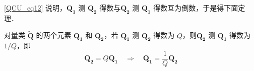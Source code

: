 \autoref{QCU_eq12} 说明，$\boldsymbol{Q_1}$ 测 $\boldsymbol{Q_2}$ 得数与$\boldsymbol{Q_2}$ 测 $\boldsymbol{Q_1}$ 得数互为倒数，于是得下面定理．
\begin{theorem}{}
对量类 $\widetilde{\boldsymbol{Q}}$ 的两个元素 $\boldsymbol{Q_1}$ 和 $\boldsymbol{Q_2}$，若 $\boldsymbol{Q_1}$ 测 $\boldsymbol{Q_2}$ 得数为 $Q$，则$\boldsymbol{Q_2}$ 测 $\boldsymbol{Q_1}$ 得数为 $1/Q$，即
\begin{equation}
\boldsymbol{Q_2}=Q\boldsymbol{Q_1}\quad\Rightarrow\quad\boldsymbol{Q_1}=\frac{1}{Q}\boldsymbol{Q_2}
\end{equation}
\end{theorem}
